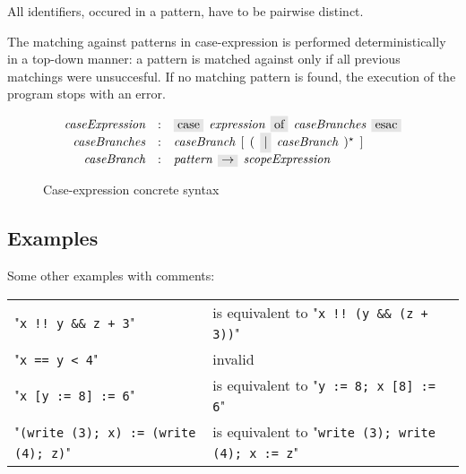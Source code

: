 All identifiers, occured in a pattern, have to be pairwise distinct.

The matching against patterns in case-expression is performed deterministically in a top-down manner: a pattern
is matched against only if all previous matchings were unsuccesful. If no matching pattern is found, the execution
of the program stops with an error.

\begin{figure}[t]
  \[
    \begin{array}{rcl}
      \defterm{caseExpression}  & : & \term{case}\s\nonterm{expression}\s\term{of}\s\nonterm{caseBranches}\s\term{esac}\\
      \defterm{caseBranches}    & : & \nonterm{caseBranch}\s[\s(\s\term{$\mid$}\s\nonterm{caseBranch}\s)^\star\s]\\
      \defterm{caseBranch}      & : & \nonterm{pattern}\s\term{$\rightarrow$}\s\nonterm{scopeExpression}
    \end{array}
  \]
  \caption{Case-expression concrete syntax}
  \label{case_expression}
\end{figure}

\subsection{Examples}
\label{sec:expression_examples}

Some other examples with comments:

\begin{tabular}{ll}
  "\lstinline|x !! y && z + 3|" & is equivalent to "\lstinline|x !! (y && (z + 3))|"\\
  "\lstinline|x == y < 4|"      & invalid \\
  "\lstinline|x [y := 8] := 6|" & is equivalent to "\lstinline|y := 8; x [8] := 6|"\\
  "\lstinline|(write (3); x) := (write (4); z)|" & is equivalent to "\lstinline|write (3); write (4); x := z|"
\end{tabular}


